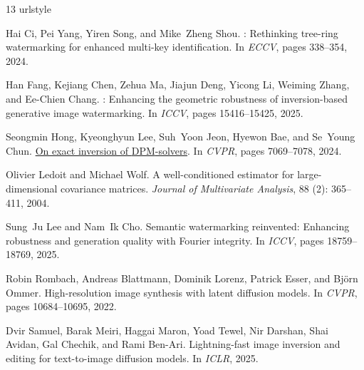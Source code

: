 \documentclass[10pt,twocolumn,letterpaper]{article}
\begin{document}
{\small
\begin{thebibliography}{13}
\providecommand{\natexlab}[1]{#1}
\providecommand{\url}[1]{\texttt{#1}}
\expandafter\ifx\csname urlstyle\endcsname\relax
  \providecommand{\doi}[1]{doi: #1}\else
  \providecommand{\doi}{doi: \begingroup \urlstyle{rm}\Url}\fi

Hai Ci, Pei Yang, Yiren Song, and Mike~Zheng Shou.
: Rethinking tree-ring watermarking for enhanced multi-key
  identification.
\newblock In \emph{ECCV}, pages 338--354, 2024.

Han Fang, Kejiang Chen, Zehua Ma, Jiajun Deng, Yicong Li, Weiming Zhang, and
  Ee-Chien Chang.
: Enhancing the geometric robustness of inversion-based
  generative image watermarking.
\newblock In \emph{ICCV}, pages 15416--15425, 2025.

Seongmin Hong, Kyeonghyun Lee, Suh~Yoon Jeon, Hyewon Bae, and Se~Young Chun.
\newblock \href{https://openaccess.thecvf.com/content/CVPR2024/html/Hong_On_Exact_Inversion_of_DPM-Solvers_CVPR_2024_paper.html}{On exact inversion of {DPM}-solvers}.
\newblock In \emph{CVPR}, pages 7069--7078, 2024.

Olivier Ledoit and Michael Wolf.
\newblock A well-conditioned estimator for large-dimensional covariance
  matrices.
\newblock \emph{Journal of Multivariate Analysis}, 88 (2):
  365--411, 2004.

Sung~Ju Lee and Nam~Ik Cho.
\newblock Semantic watermarking reinvented: Enhancing robustness and generation
  quality with Fourier integrity.
\newblock In \emph{ICCV}, pages 18759--18769, 2025.

Robin Rombach, Andreas Blattmann, Dominik Lorenz, Patrick Esser, and Bj{\"o}rn
  Ommer.
\newblock High-resolution image synthesis with latent diffusion models.
\newblock In \emph{CVPR}, pages 10684--10695, 2022.

Dvir Samuel, Barak Meiri, Haggai Maron, Yoad Tewel, Nir Darshan, Shai Avidan,
  Gal Chechik, and Rami Ben-Ari.
\newblock Lightning-fast image inversion and editing for text-to-image
  diffusion models.
\newblock In \emph{ICLR}, 2025.


\end{thebibliography}}
\end{document}
